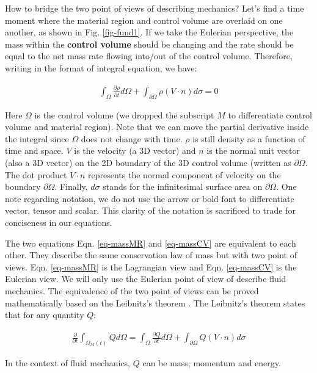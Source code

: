 \documentclass[12pt, letterpaper]{report}
\begin{document}
How to bridge the two point of views of describing mechanics? Let's find a time moment where the
material region and control volume are overlaid on one another, as shown in Fig. \ref{fig-fund1}.
If we take the Eulerian perspective, the mass within the {\bf control volume} should be changing
and the rate should be equal to the net mass rate flowing into/out of the control volume. Therefore,
writing in the format of integral equation, we have:

\begin{align}\label{eq-massCV}
   \int_{\Omega}\frac{\partial \rho}{\partial t}d\Omega + \int_{\partial \Omega}\rho (V\cdot n)
   d\sigma = 0
\end{align}

Here $\Omega$ is the control volume (we dropped the subscript $M$ to differentiate control volume
and material region). Note that we can move the partial derivative inside the integral since
$\Omega$ does not change with time. $\rho$ is still density as a function of time and space. $V$ is
the velocity (a 3D vector) and $n$ is the normal unit vector (also a 3D vector) on the 2D boundary
of the 3D control volume (written as $\partial \Omega$. The dot product $V\cdot n$ represents the
normal component of velocity on the boundary $\partial \Omega$. Finally, $d\sigma$ stands for the
infinitesimal surface area on $\partial \Omega$. One note regarding notation, we do not use the
arrow or bold font to differentiate vector, tensor and scalar. This clarity of the notation is
sacrificed to trade for conciseness in our equations.  \paraspace

The two equations Eqn. \ref{eq-massMR} and \ref{eq-massCV} are equivalent to each other. They
describe the same conservation law of mass but with two point of views. Eqn.
\ref{eq-massMR} is the Lagrangian view and Eqn. \ref{eq-massCV} is the Eulerian view. We will only use
the Eulerian point of view of describe fluid mechanics. The equivalence of the two point of views
can be proved mathematically based on the Leibnitz's theorem \cite{panton2013incompressible}. The
Leibnitz's theorem states that for any quantity $Q$:

\begin{align}\label{eq-Leib}
   \frac{\partial}{\partial t}\int_{\Omega_M(t)}Q d\Omega = \int_\Omega \frac{\partial Q}{\partial
   t}d\Omega + \int_{\partial\Omega}Q (V\cdot n)d\sigma
\end{align}

In the context of fluid mechanics, $Q$ can be mass, momentum and energy.
\paraspace
\end{document}
